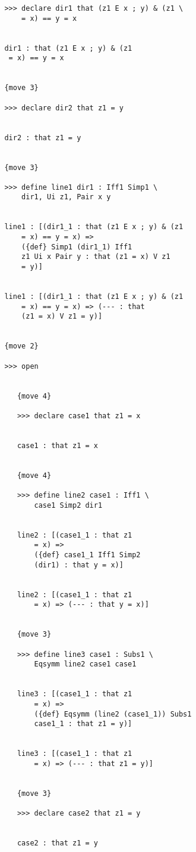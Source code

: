 \documentclass[12pt]{article}
\begin{document}
\begin{verbatim}
         >>> declare dir1 that (z1 E x ; y) & (z1 \
             = x) == y = x


         dir1 : that (z1 E x ; y) & (z1 
          = x) == y = x


         {move 3}

         >>> declare dir2 that z1 = y


         dir2 : that z1 = y


         {move 3}

         >>> define line1 dir1 : Iff1 Simp1 \
             dir1, Ui z1, Pair x y


         line1 : [(dir1_1 : that (z1 E x ; y) & (z1 
             = x) == y = x) => 
             ({def} Simp1 (dir1_1) Iff1 
             z1 Ui x Pair y : that (z1 = x) V z1 
             = y)]


         line1 : [(dir1_1 : that (z1 E x ; y) & (z1 
             = x) == y = x) => (--- : that 
             (z1 = x) V z1 = y)]


         {move 2}

         >>> open


            {move 4}

            >>> declare case1 that z1 = x


            case1 : that z1 = x


            {move 4}

            >>> define line2 case1 : Iff1 \
                case1 Simp2 dir1


            line2 : [(case1_1 : that z1 
                = x) => 
                ({def} case1_1 Iff1 Simp2 
                (dir1) : that y = x)]


            line2 : [(case1_1 : that z1 
                = x) => (--- : that y = x)]


            {move 3}

            >>> define line3 case1 : Subs1 \
                Eqsymm line2 case1 case1


            line3 : [(case1_1 : that z1 
                = x) => 
                ({def} Eqsymm (line2 (case1_1)) Subs1 
                case1_1 : that z1 = y)]


            line3 : [(case1_1 : that z1 
                = x) => (--- : that z1 = y)]


            {move 3}

            >>> declare case2 that z1 = y


            case2 : that z1 = y



\end{verbatim}
\end{document}
